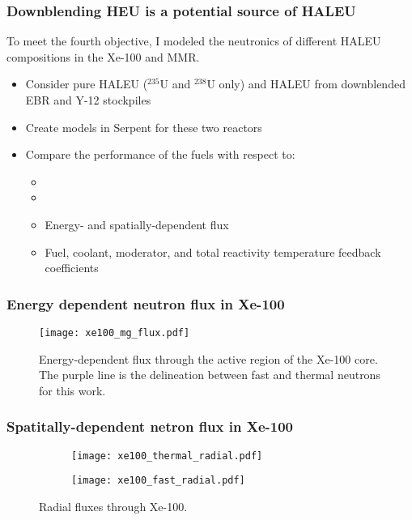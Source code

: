 \begin{frame}
    \frametitle{Downblending HEU is a potential source of HALEU}
    To meet the fourth objective, I modeled the neutronics of 
    different HALEU compositions in the Xe-100 and MMR.
    \begin{itemize}
        \item Consider pure HALEU ($^{235}$U and $^{238}$U only)
              and HALEU from downblended \gls{EBR} 
              \cite{vaden_isotopic_2018} and Y-12 
              \cite{nelson_foreign_2010} stockpiles
        \item Create models in Serpent \cite{leppanen_serpent_2013} 
              for these two reactors
        \item Compare the performance of the fuels with respect to:
        \begin{itemize}
            \item \keff
            \item \betaEff
            \item Energy- and spatially-dependent flux
            \item Fuel, coolant, moderator, and total reactivity
                  temperature feedback coefficients
        \end{itemize}
    \end{itemize}

\end{frame}

\begin{frame}
    \frametitle{Energy dependent neutron flux in Xe-100}
    \begin{figure}
        \centering 
        \texttt{[image: xe100\_mg\_flux.pdf]}
        \caption{Energy-dependent flux through the active region 
        of the Xe-100 core. The purple line is the delineation 
        between fast and thermal neutrons for this work.}
    \end{figure}
\end{frame}

\begin{frame}
    \frametitle{Spatitally-dependent netron flux in Xe-100}
    \begin{figure}
        \centering 
        \begin{subfigure}{0.49\textwidth}
            \texttt{[image: xe100\_thermal\_radial.pdf]}
        \end{subfigure}
        \begin{subfigure}{0.49\textwidth}
            \texttt{[image: xe100\_fast\_radial.pdf]}
        \end{subfigure}
        \caption{Radial fluxes through Xe-100.}
        \label{fig:xe100-flux}
    \end{figure}
\end{frame}
